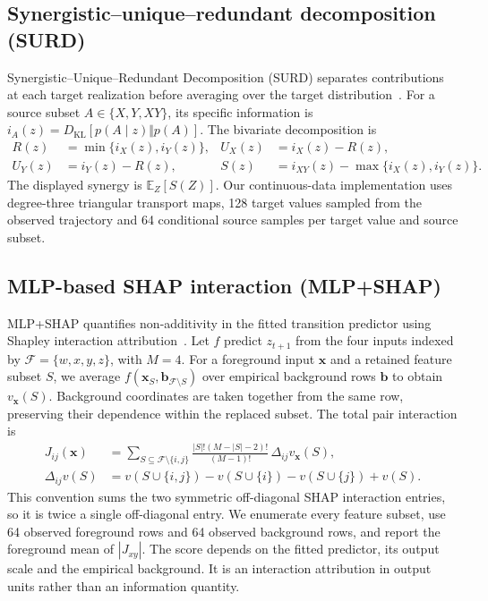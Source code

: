 \documentclass[fleqn,10pt]{wlscirep}
\begin{document}
\subsection{Synergistic--unique--redundant decomposition (SURD)}
\label{app:surd}
Synergistic--Unique--Redundant Decomposition (SURD) separates contributions at each target realization before averaging over the target distribution~\cite{MartnezSnchez2024DecomposingCI}. For a source subset $A\in\{X,Y,XY\}$, its specific information is $i_A(z)=D_{\mathrm{KL}}[p(A\mid z)\Vert p(A)]$. The bivariate decomposition is
\begingroup
\begin{equation}
\begin{aligned}
R(z)&=\min\{i_X(z),i_Y(z)\}, &
U_X(z)&=i_X(z)-R(z),\\
U_Y(z)&=i_Y(z)-R(z), &
S(z)&=i_{XY}(z)-\max\{i_X(z),i_Y(z)\}.
\end{aligned}
\end{equation}
\endgroup
The displayed synergy is $\mathbb E_Z[S(Z)]$. Our continuous-data implementation uses degree-three triangular transport maps, 128 target values sampled from the observed trajectory and 64 conditional source samples per target value and source subset. 

\subsection{MLP-based SHAP interaction (MLP+SHAP)}
\label{app:shap}
MLP+SHAP quantifies non-additivity in the fitted transition predictor using Shapley interaction attribution~\cite{lundberg2017unified,Lundberg2020FromLocal}. Let $f$ predict $z_{t+1}$ from the four inputs indexed by $\mathcal F=\{w,x,y,z\}$, with $M=4$. For a foreground input $\boldsymbol{x}$ and a retained feature subset $S$, we average $f(\boldsymbol{x}_S,\boldsymbol{b}_{\mathcal F\setminus S})$ over empirical background rows $\boldsymbol{b}$ to obtain $v_{\boldsymbol{x}}(S)$. Background coordinates are taken together from the same row, preserving their dependence within the replaced subset. The total pair interaction is
\begingroup
\begin{equation}
\begin{aligned}
J_{ij}(\boldsymbol{x})&=\sum_{S\subseteq\mathcal F\setminus\{i,j\}}
\frac{|S|!(M-|S|-2)!}{(M-1)!}\,\Delta_{ij}v_{\boldsymbol{x}}(S),\\
\Delta_{ij}v(S)&=v(S\cup\{i,j\})-v(S\cup\{i\})-v(S\cup\{j\})+v(S).
\end{aligned}
\end{equation}
\endgroup
This convention sums the two symmetric off-diagonal SHAP interaction entries, so it is twice a single off-diagonal entry. We enumerate every feature subset, use 64 observed foreground rows and 64 observed background rows, and report the foreground mean of $|J_{xy}|$. The score depends on the fitted predictor, its output scale and the empirical background. It is an interaction attribution in output units rather than an information quantity.
\end{document}
